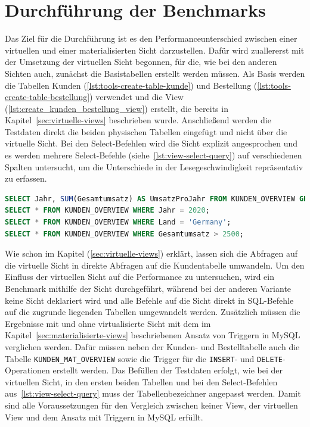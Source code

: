 \section{Durchführung der Benchmarks}\label{sec:durchfuhrung-der-benchmarks}

Das Ziel für die Durchführung ist es den Performanceunterschied zwischen einer virtuellen und einer materialisierten Sicht darzustellen.
Dafür wird zuallererst mit der Umsetzung der virtuellen Sicht begonnen, für die, wie bei den anderen Sichten auch, zunächst die Basistabellen erstellt werden müssen.
Als Basis werden die Tabellen Kunden (\ref{lst:tools-create-table-kunde}) und Bestellung (\ref{lst:tools-create-table-bestellung}) verwendet und die View (\ref{lst:create_kunden_bestellung_view}) erstellt, die bereits in Kapitel~\ref{sec:virtuelle-views} beschrieben wurde.
Anschließend werden die Testdaten direkt die beiden physischen Tabellen eingefügt und nicht über die virtuelle Sicht.
Bei den Select-Befehlen wird die Sicht explizit angesprochen und es werden mehrere Select-Befehle (siehe~\ref{lst:view-select-query}) auf verschiedenen Spalten untersucht, um die Unterschiede in der Lesegeschwindigkeit repräsentativ zu erfassen.

\vspace{-5pt}
\begin{lstlisting}[language=SQL,caption=Select-Abfragen auf alle Spalten der View,label={lst:view-select-query}]
SELECT Jahr, SUM(Gesamtumsatz) AS UmsatzProJahr FROM KUNDEN_OVERVIEW GROUP BY Jahr;
SELECT * FROM KUNDEN_OVERVIEW WHERE Jahr = 2020;
SELECT * FROM KUNDEN_OVERVIEW WHERE Land = 'Germany';
SELECT * FROM KUNDEN_OVERVIEW WHERE Gesamtumsatz > 2500;
\end{lstlisting}
\vspace{-5pt}

Wie schon im Kapitel (\ref{sec:virtuelle-views}) erklärt, lassen sich die Abfragen auf die virtuelle Sicht in direkte Abfragen auf die Kundentabelle umwandeln.
Um den Einfluss der virtuellen Sicht auf die Performance zu untersuchen, wird ein Benchmark mithilfe der Sicht durchgeführt, während bei der anderen Variante keine Sicht deklariert wird und alle Befehle auf die Sicht direkt in SQL-Befehle auf die zugrunde liegenden Tabellen umgewandelt werden.
Zusätzlich müssen die Ergebnisse mit und ohne virtualisierte Sicht mit dem im Kapitel~\ref{sec:materialisierte-views} beschriebenen Ansatz von Triggern in MySQL verglichen werden.
Dafür müssen neben der Kunden- und Bestelltabelle auch die Tabelle \texttt{KUNDEN\_MAT\_OVERVIEW} sowie die Trigger für die \texttt{INSERT}- und \texttt{DELETE}-Operationen erstellt werden.
Das Befüllen der Testdaten erfolgt, wie bei der virtuellen Sicht, in den ersten beiden Tabellen und bei den Select-Befehlen aus~\ref{lst:view-select-query} muss der Tabellenbezeichner angepasst werden.
Damit sind alle Voraussetzungen für den Vergleich zwischen keiner View, der virtuellen View und dem Ansatz mit Triggern in MySQL erfüllt.

